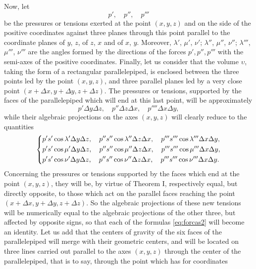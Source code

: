 \documentclass[leqno,openright,smallroyalvopaper,8pt,twoside,showtrims]{memoir}
\begin{document}
Now, let 
\begin{equation}
p',\quad p'',\quad p'''
\end{equation}
be the pressures or tensions exerted at the point $(x,y,z)$ and on the side of the positive coordinates against three planes through this point parallel to the coordinate planes of $y$, $z$, of $z$, $x$ and of $x$, $y$. Moreover, $\lambda'$, $\mu'$, $\nu'$; $\lambda''$, $\mu''$, $\nu''$; $\lambda'''$, $\mu'''$, $\nu'''$ are the angles formed by the directions
of the forces $p', p'',p'''$ with the semi-axes of the positive coordinates. Finally, let us consider that the volume $\upsilon$, taking the form of a rectangular parallelepiped, is enclosed between the three points led by the point $(x, y, z)$, and three parallel planes led by a very close point $(x+\Delta x, y+\Delta y, z+\Delta z)$. The pressures or tensions, supported by the faces of the parallelepiped which will end at this last point, will be approximately
\begin{equation}
p'\Delta y\Delta z,\quad p''\Delta z\Delta x,\quad p''''\Delta x\Delta y,
\end{equation}
while their algebraic projections on the axes $(x,y,z)$ will clearly reduce to the quantities
\begin{equation}
   \begin{dcases}
       p's'\cos\lambda'\Delta y\Delta z,\quad p''s''\cos\lambda''\Delta z\Delta x,\quad p'''s'''\cos\lambda'''\Delta x\Delta y,\\
       p's'\cos\mu'\Delta y\Delta z,\quad p''s''\cos\mu''\Delta z\Delta x,\quad p'''s'''\cos\mu'''\Delta x\Delta y,\\
       p's'\cos\nu'\Delta y\Delta z,\quad p''s''\cos\nu''\Delta z\Delta x,\quad p'''s'''\cos\nu'''\Delta x\Delta y.
   \end{dcases}
 \end{equation}
Concerning the pressures or tensions supported by the faces which end at the point $(x, y, z)$, they will be, by virtue of Theorem I, respectively equal, but directly opposite, to those which act on the parallel faces reaching the point $(x+\Delta x, y+\Delta y, z+\Delta z)$. So the algebraic projections of these new tensions will be numerically equal to the algebraic projections of the other three, but affected by opposite signs, so that each of the formulas \eqref{eq:forcas2} will become an identity. Let us add that the centers of gravity of the six faces of the parallelepiped will merge with their geometric centers, and will be located on three lines carried out parallel to the axes $(x, y, z)$ through the center of the parallelepiped, that is to say, through the point which has for coordinates
\end{document}
